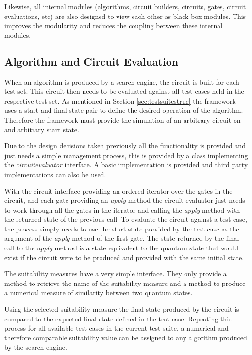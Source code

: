 Likewise, all internal modules (algorithms, circuit builders, circuits, gates, circuit evaluations, etc) are also designed to view each other as black box modules.
This improves the modularity and reduces the coupling between these internal modules.

\subsection{Algorithm and Circuit Evaluation}
\label{sec:cireval}
When an algorithm is produced by a search engine, the circuit is built for each test set.
This circuit then needs to be evaluated against all test cases held in the respective test set.
As mentioned in Section \ref{sec:testsuitestruc} the framework uses a start and final state pair to define the desired operation of the algorithm.
Therefore the framework must provide the simulation of an arbitrary circuit on and arbitrary start state.

Due to the design decisions taken previously all the functionality is provided and just needs a simple management process, this is provided by a class implementing the \emph{circuitevaluator} interface.
A basic implementation is provided and third party implementations can also be used.

With the circuit interface providing an ordered iterator over the gates in the circuit, and each gate providing an \emph{apply} method the circuit evaluator just needs to work through all the gates in the iterator and calling the \emph{apply} method with the returned state of the previous call.
To evaluate the circuit against a test case, the process simply needs to use the start state provided by the test case as the argument of the \emph{apply} method of the first gate.
The state returned by the final call to the \emph{apply} method is a state equivalent to the quantum state that would exist if the circuit were to be produced and provided with the same initial state.

The suitability measures have a very simple interface.
They only provide a method to retrieve the name of the suitability measure and a method to produce a numerical measure of similarity between two quantum states.

Using the selected suitability measure the final state produced by the circuit is compared to the expected final state defined in the test case.
Repeating this process for all available test cases in the current test suite, a numerical and therefore comparable suitability value can be assigned to any algorithm produced by the search engine.

